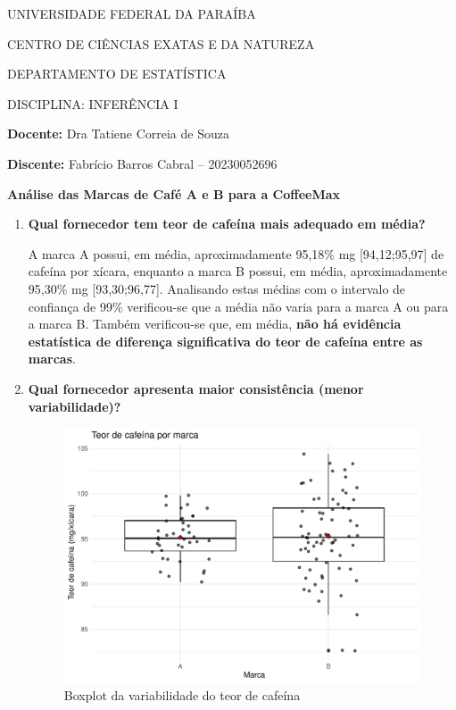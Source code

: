 \documentclass[11pt]{article}
\begin{document}
\begin{center}
UNIVERSIDADE FEDERAL DA PARAÍBA

CENTRO DE CIÊNCIAS EXATAS E DA NATUREZA

DEPARTAMENTO DE ESTATÍSTICA

DISCIPLINA: INFERÊNCIA I
\end{center}

\textbf{Docente:} Dra Tatiene Correia de Souza

\textbf{Discente:} Fabrício Barros Cabral -- 20230052696

\begin{center}
{\Large \textbf{Análise das Marcas de Café A e B para a CoffeeMax}}
\end{center}

\begin{enumerate}
    \item \textbf{Qual fornecedor tem teor de cafeína mais adequado em média?}

    A marca A possui, em média, aproximadamente 95,18\% mg [94,12;95,97] de
    cafeína por xícara, enquanto a marca B possui, em média, aproximadamente
    95,30\% mg [93,30;96,77]. Analisando estas médias com o intervalo de
    confiança de 99\% verificou-se que a média não varia para a marca A ou para
    a marca B. Também verificou-se que, em média, \textbf{não há evidência
    estatística de diferença significativa do teor de cafeína entre as marcas}.

    \item \textbf{Qual fornecedor apresenta maior consistência (menor
    variabilidade)?}

    \begin{figure}[h!]
        \centering
        \includegraphics[scale=0.4]{plots/boxplot_cafeina_AB.pdf}
        \caption{Boxplot da variabilidade do teor de cafeína}
        \label{fig:boxplot-cafeina}
    \end{figure}


\end{enumerate}
\end{document}
